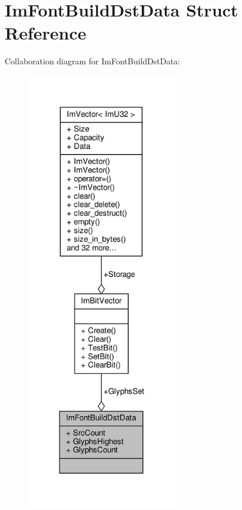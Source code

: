 \hypertarget{structImFontBuildDstData}{}\section{Im\+Font\+Build\+Dst\+Data Struct Reference}
\label{structImFontBuildDstData}


Collaboration diagram for Im\+Font\+Build\+Dst\+Data\+:
\nopagebreak
\begin{figure}[H]
\begin{center}
\leavevmode
\includegraphics[width=188pt]{structImFontBuildDstData__coll__graph}
\end{center}
\end{figure}
